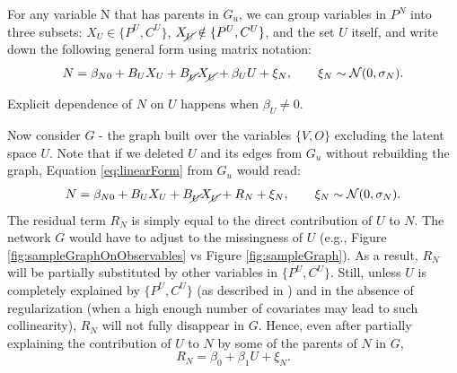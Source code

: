 \documentclass{article}
\begin{document}
For any variable N that has parents in $G_u$, we can group variables in $P^N$ into three subsets: $X_U \in \{P^U, C^U\}$, $X_{\cancel{U}} \notin \{P^U, C^U\}$, and the set $U$ itself, and write down the following general form using matrix notation:
\begin{equation}
N = \beta_{N0} + B_U X_U + B_{\cancel{U}} X_{\cancel{U}} + \beta_U U + \xi_N, \qquad \xi_N \sim \mathcal{N}(0, \sigma_{N}).
\label{eq:linearForm}
\end{equation}

Explicit dependence of $N$ on $U$ happens when $\beta_U \neq 0$.  

Now consider $G$ - the graph built over the variables $\{V, O\}$ excluding the latent space $U$.  Note that if we deleted $U$ and its edges from $G_u$ without rebuilding the graph, Equation \ref{eq:linearForm} from $G_u$ would read:
\begin{equation}
N = \beta_{N0} + B_U X_U + B_{\cancel{U}} X_{\cancel{U}} + R_N + \xi_N, \qquad \xi_N \sim \mathcal{N}(0, \sigma_{N}). 
\label{eq:linearFormNoU}
\end{equation}
The residual term $R_N$ is simply equal to the direct contribution of $U$ to $N$.  The network $G$ would have to adjust to the missingness of $U$ (e.g., Figure \ref{fig:sampleGraphOnObservables} vs Figure \ref{fig:sampleGraph}).  As a result, $R_N$ will be partially substituted by other variables in $\{P^U, C^U\}$.  Still, unless $U$ is completely explained by $\{P^U, C^U\}$ (as described in \cite{damour_multi-cause_2019}) and in the absence of regularization (when a high enough number of covariates may lead to such collinearity), $R_N$ will not fully disappear in $G$.  Hence, even after partially explaining the contribution of $U$ to $N$ by some of the parents of $N$ in $G$, 
\begin{equation}
R_N = \beta_0 + \beta_1 U + \xi_N.
\label{eq:residualColumn}
\end{equation}
\end{document}
